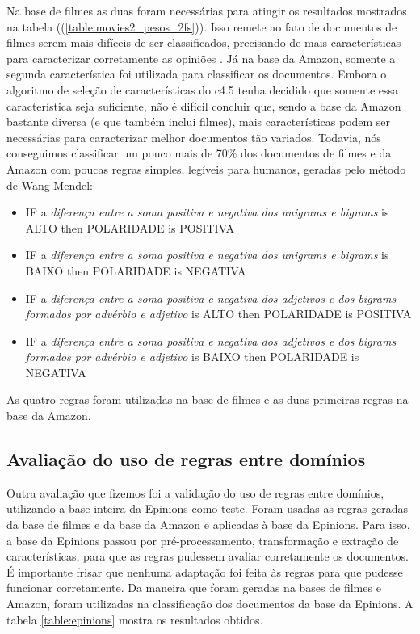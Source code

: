 Na base de filmes as duas foram necessárias para atingir os resultados mostrados na tabela ((\ref{table:movies2_pesos_2fs})). Isso remete ao fato de documentos de filmes serem mais difíceis de ser classificados, precisando de mais características para caracterizar corretamente as opiniões \cite{turney2002thumbs, pang2004sentimental, chaovalit2005movie, ohana2009sentiment}. Já na base da Amazon, somente a segunda característica foi utilizada para classificar os documentos. Embora o algoritmo de seleção de características do c4.5 tenha decidido que somente essa característica seja suficiente, não é difícil concluir que, sendo a base da Amazon bastante diversa (e que também inclui filmes), mais características podem ser necessárias para caracterizar melhor documentos tão variados.
Todavia, nós conseguimos classificar um pouco mais de 70\% dos documentos de filmes e da Amazon com poucas regras simples, legíveis para humanos, geradas pelo método de Wang-Mendel:

\begin{itemize}
\item IF a \textit{diferença entre a soma positiva e negativa dos unigrams e bigrams} is ALTO then POLARIDADE is POSITIVA
\item IF a \textit{diferença entre a soma positiva e negativa dos unigrams e bigrams} is BAIXO then POLARIDADE is NEGATIVA
\item IF a \textit{diferença entre a soma positiva e negativa dos adjetivos e dos bigrams formados por advérbio e adjetivo} is ALTO then POLARIDADE is POSITIVA
\item IF a \textit{diferença entre a soma positiva e negativa dos adjetivos e dos bigrams formados por advérbio e adjetivo} is BAIXO then POLARIDADE is NEGATIVA
\end{itemize}

As quatro regras foram utilizadas na base de filmes e as duas primeiras regras na base da Amazon.

\subsection{Avaliação do uso de regras entre domínios}

Outra avaliação que fizemos foi a validação do uso de regras entre domínios, utilizando a base inteira da Epinions como teste. Foram usadas as regras geradas da base de filmes e da base da Amazon e aplicadas à base da Epinions. Para isso, a base da Epinions passou por pré-processamento, transformação e extração de características, para que as regras pudessem avaliar corretamente os documentos. É importante frisar que nenhuma adaptação foi feita às regras para que pudesse funcionar corretamente. Da maneira que foram geradas na bases de filmes e Amazon, foram utilizadas na classificação dos documentos da base da Epinions. A tabela \ref{table:epinions} mostra os resultados obtidos.

